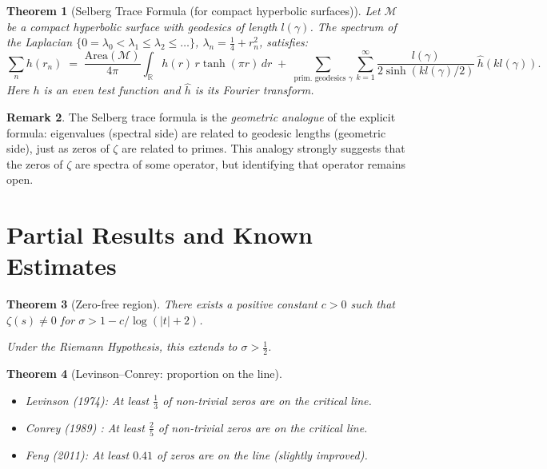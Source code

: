 \documentclass[12pt,a4paper]{amsart}
\newtheorem{theorem}{Theorem}[section]
\theoremstyle{definition}
\newtheorem{remark}[theorem]{Remark}
\newcommand{\R}{\mathbb{R}}
\begin{document}
\begin{theorem}[Selberg Trace Formula (for compact hyperbolic surfaces)]
\label{thm:selberg_trace}
Let $\mathcal{M}$ be a compact hyperbolic surface with geodesics of
length $l(\gamma)$.  The spectrum of the Laplacian
$\{0 = \lambda_0 < \lambda_1 \le \lambda_2 \le \ldots\}$,
$\lambda_n = \tfrac{1}{4} + r_n^2$, satisfies:
\[
  \sum_n h(r_n) \;=\; \frac{\text{Area}(\mathcal{M})}{4\pi}
  \int_\R h(r)\,r\tanh(\pi r)\,dr
  \;+\; \sum_{\text{prim.\ geodesics } \gamma} \sum_{k=1}^\infty
  \frac{l(\gamma)}{2\sinh(k l(\gamma)/2)}\,\hat h(k l(\gamma)).
\]
Here $h$ is an even test function and $\hat h$ is its Fourier transform.
\end{theorem}

\begin{remark}
The Selberg trace formula is the \emph{geometric analogue} of the explicit
formula: eigenvalues (spectral side) are related to geodesic lengths
(geometric side), just as zeros of $\zeta$ are related to primes.
This analogy strongly suggests that the zeros of $\zeta$ are spectra of
some operator, but identifying that operator remains open.
\end{remark}

\section{Partial Results and Known Estimates}

\begin{theorem}[Zero-free region]
\label{thm:zero_free}
There exists a positive constant $c > 0$ such that $\zeta(s) \ne 0$
for $\sigma > 1 - c/\log(|t|+2)$.

Under the Riemann Hypothesis, this extends to $\sigma > \tfrac{1}{2}$.
\end{theorem}

\begin{theorem}[Levinson--Conrey: proportion on the line]
\label{thm:levinson_conrey}
\begin{itemize}
  \item Levinson (1974): At least $\tfrac{1}{3}$ of non-trivial zeros are
    on the critical line.
  \item Conrey (1989) \cite{Conrey1989}: At least $\tfrac{2}{5}$ of
    non-trivial zeros are on the critical line.
  \item Feng (2011): At least $0.41$ of zeros are on the line
    (slightly improved).
\end{itemize}
\end{theorem}
\end{document}
